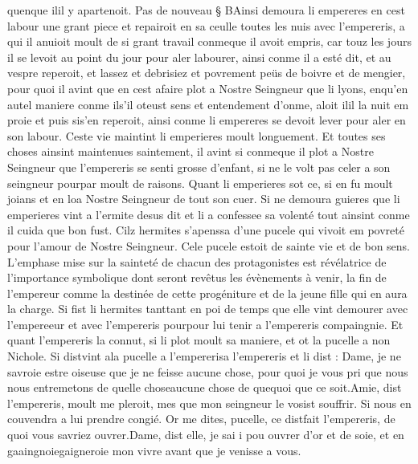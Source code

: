 \documentclass{article}
\begin{document}
\begin{pages}
   quenque ilil y apartenoit. \pend
\pstart Pas de nouveau § BAinsi demoura 
   li empereres en cest labour une grant piece 
   et repairoit en sa ceulle toutes les nuis avec l’empereris, 
   a qui il anuioit moult de si grant travail conmeque il avoit empris, 
   car touz les jours il se levoit au point du jour pour aler labourer,
   ainsi conme il a esté dit, et au vespre reperoit, et lassez et debrisiez et povrement peüs de boivre et de mengier, 
   pour quoi il avint que en cest afaire plot a Nostre Seingneur que 
   li lyons, enqu'en 
   autel maniere conme ils'il 
   oteust sens et entendement d’onme, aloit 
   ilil la nuit em proie et puis 
   sis'en reperoit,
   ainsi conme li empereres se devoit lever pour aler en son labour. \pend
\pstart Ceste vie maintint li emperieres moult longuement.
   Et toutes ses choses ainsint maintenues saintement, il avint 
   si conmeque il plot a Nostre Seingneur que
   l’empereris se senti grosse d’enfant, si ne le volt pas celer a 
   son seingneur pourpar moult de raisons. 
   Quant li emperieres 
   sot ce, si en fu moult joians et en loa Nostre Seingneur de tout son cuer. Si ne demoura guieres que 
   li emperieres vint a l’ermite 
   desus dit et li a confessee sa volenté tout ainsint conme il cuida que bon fust.
   Cilz hermites s’apenssa d’une 
   pucele qui vivoit em povreté pour l’amour de Nostre Seingneur. 
   Cele pucele estoit de sainte vie et de bon sens.
   L'emphase mise sur la sainteté de chacun des protagonistes est révélatrice de l'importance symbolique 
   dont seront revêtus les évènements à venir, la fin de l'empereur comme la destinée de cette progéniture et de la jeune fille qui en 
   aura la charge. Si fist li hermites 
   tanttant en poi de temps 
   que elle vint demourer avec l’empereeur et avec l’empereris 
   pourpour lui tenir 
      a l’empereris 
      compaingnie. 
   Et quant l’empereris la connut, 
   si li plot moult sa maniere, et ot la pucelle a non Nichole. 
   Si distvint 
   ala pucelle a 
   l’empererisa l'empereris et li dist :
   Dame, je ne savroie estre oiseuse que je ne feisse aucune chose, 
      pour quoi je vous pri que nous nous entremetons de
      quelle choseaucune chose de 
      quequoi que ce soit.Amie, dist l’empereris, moult me pleroit, mes que 
      mon seingneur le vosist souffrir. Si nous en
      couvendra a lui prendre congié. Or me dites, 
      pucelle, ce distfait 
         l’empereris,
      de quoi vous savriez ouvrer.Dame, dist elle, je sai i pou ouvrer d’or et de soie, et en 
      gaaingnoiegaigneroie mon vivre 
      avant que je venisse a vous. \pend

\end{pages}
\end{document}
